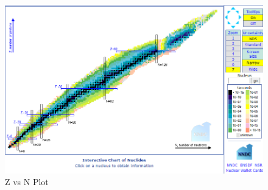 \documentclass[ebook,12pt,oneside,openany]{memoir}
\begin{document}
        \begin{figure}
            \centering
            \includegraphics[width = \textwidth]{images/ZvN_plot.png}
            \caption{Z vs N Plot}
            \label{fig:plot_ZvsN}
        \end{figure}
    
\end{document}
